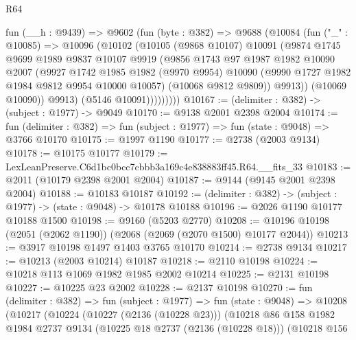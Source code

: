 \begin{lexlean}{R64}
\begin{coremodule}
            fun (__h : @9439) =>
            @9602
              (fun (byte : @382) =>
              @9688
                (@10084
                  (fun ("_" : @10085) =>
                  @10096
                    (@10102
                      (@10105
                        (@9868 @10107)
                        @10091
                        (@9874
                          @1745
                          @9699
                          @1989
                          @9837
                          @10107
                          @9919
                          (@9856
                            @1743
                            @97
                            @1987
                            @1982
                            @10090
                            @2007
                            (@9927
                              @1742
                              @1985
                              @1982
                              (@9970 @9954)
                              @10090
                              (@9990 @1727 @1982 @1984 @9812 @9954 @10000 @10057)
                              (@10068 @9812 @9809))
                            @9913))
                        (@10069 @10090))
                      @9913)
                    (@5146 @10091)))))))))
@10167 := (delimiter : @382) -> (subject : @1977) -> @9049
@10170 := @9138 @2001 @2398 @2004
@10174 := fun (delimiter : @382) => fun (subject : @1977) => fun (state : @9048) => @3766 @10170
@10175 := @1997 @1190
@10177 := @2738 (@2003 @9134)
@10178 := @10175 @10177
@10179 := LexLeanPreserve.C6d1bc0bcc7cbbb3a169c4e838883ff45.R64.__fits_33
@10183 := @2011 (@10179 @2398 @2001 @2004)
@10187 := @9144 (@9145 @2001 @2398 @2004)
@10188 := @10183 @10187
@10192 := (delimiter : @382) -> (subject : @1977) -> (state : @9048) -> @10178 @10188
@10196 := @2026 @1190 @10177 @10188 @1500
@10198 := @9160 (@5203 @2770)
@10208 := @10196 @10198 (@2051 (@2062 @1190)) (@2068 (@2069 (@2070 @1500) @10177 @2044))
@10213 := @3917 @10198 @1497 @1403 @3765 @10170
@10214 := @2738 @9134
@10217 := @10213 (@2003 @10214) @10187
@10218 := @2110 @10198
@10224 := @10218 @113 @1069 @1982 @1985 @2002 @10214
@10225 := @2131 @10198
@10227 := @10225 @23 @2002
@10228 := @2137 @10198
@10270 := fun (delimiter : @382) =>
  fun (subject : @1977) =>
  fun (state : @9048) =>
  @10208
    (@10217
      (@10224
        (@10227 (@2136 (@10228 @23)))
        (@10218
          @86
          @158
          @1982
          @1984
          @2737
          @9134
          (@10225 @18 @2737 (@2136 (@10228 @18)))
          (@10218
            @156

\end{coremodule}
\end{lexlean}
